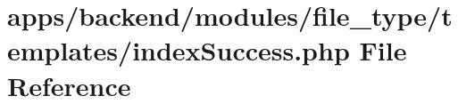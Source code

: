 \hypertarget{backend_2modules_2file__type_2templates_2index_success_8php}{\section{apps/backend/modules/file\-\_\-type/templates/index\-Success.php File Reference}
\label{backend_2modules_2file__type_2templates_2index_success_8php}
}
